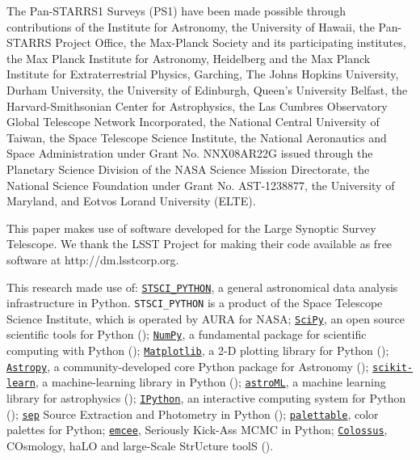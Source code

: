 \documentclass{emulateapj}
\begin{document}
\begin{CJK*}{UTF8}{gbsn}
  The Pan-STARRS1 Surveys (PS1) have been made possible through contributions of the 
  Institute for Astronomy, the University of Hawaii, the Pan-STARRS Project Office, 
  the Max-Planck Society and its participating institutes, the Max Planck Institute 
  for Astronomy, Heidelberg and the Max Planck Institute for Extraterrestrial Physics, 
  Garching, The Johns Hopkins University, Durham University, the University of Edinburgh, 
  Queen's University Belfast, the Harvard-Smithsonian Center for Astrophysics, the Las 
  Cumbres Observatory Global Telescope Network Incorporated, the National Central 
  University of Taiwan, the Space Telescope Science Institute, the National Aeronautics 
  and Space Administration under Grant No. NNX08AR22G issued through the Planetary 
  Science Division of the NASA Science Mission Directorate, the National Science 
  Foundation under Grant No. AST-1238877, the University of Maryland, and Eotvos 
  Lorand University (ELTE).
  
  This paper makes use of software developed for the Large Synoptic Survey 
  Telescope. We thank the LSST Project for making their code available as free 
  software at http://dm.lsstcorp.org.
 
  This research made use of:
  \href{http://www.stsci.edu/institute/software_hardware/pyraf/stsci\_python}{\texttt{STSCI\_PYTHON}},
      a general astronomical data analysis infrastructure in Python. 
      \texttt{STSCI\_PYTHON} is a product of the Space Telescope Science Institute, 
      which is operated by AURA for NASA;
  \href{http://www.scipy.org/}{\texttt{SciPy}},
      an open source scientific tools for Python (\citealt{SciPy});
  \href{http://www.numpy.org/}{\texttt{NumPy}}, 
      a fundamental package for scientific computing with Python (\citealt{NumPy});
  \href{http://matplotlib.org/}{\texttt{Matplotlib}}, 
      a 2-D plotting library for Python (\citealt{Matplotlib});
  \href{http://www.astropy.org/}{\texttt{Astropy}}, a community-developed 
      core Python package for Astronomy (\citealt{AstroPy}); 
  \href{http://scikit-learn.org/stable/index.html}{\texttt{scikit-learn}},
      a machine-learning library in Python (\citealt{scikit-learn}); 
  \href{http://www.astroml.org/}{\texttt{astroML}}, 
      a machine learning library for astrophysics (\citealt{astroML});
  \href{https://ipython.org}{\texttt{IPython}}, 
      an interactive computing system for Python (\citealt{IPython});
  \href{https://github.com/kbarbary/sep}{\texttt{sep}} 
      Source Extraction and Photometry in Python (\citealt{PythonSEP});
  \href{https://jiffyclub.github.io/palettable/}{\texttt{palettable}},
      color palettes for Python;
  \href{http://dan.iel.fm/emcee/current/}{\texttt{emcee}}, 
      Seriously Kick-Ass MCMC in Python;
  \href{http://bdiemer.bitbucket.org/}{\texttt{Colossus}}, 
      COsmology, haLO and large-Scale StrUcture toolS (\citealt{Colossus}).


\end{CJK*}
\end{document}
